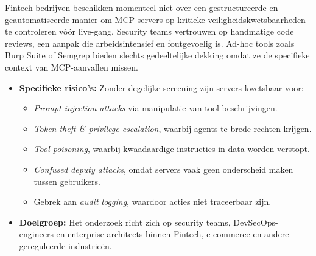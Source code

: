 Fintech-bedrijven beschikken momenteel niet over een gestructureerde en geautomatiseerde manier om MCP-servers op kritieke veiligheidskwetsbaarheden te controleren vóór live-gang. Security teams vertrouwen op handmatige code reviews, een aanpak die arbeidsintensief en foutgevoelig is. Ad-hoc tools zoals Burp Suite of Semgrep bieden slechts gedeeltelijke dekking omdat ze de specifieke context van MCP-aanvallen missen.

\begin{itemize}
  \item \textbf{Specifieke risico's:} Zonder degelijke screening zijn servers kwetsbaar voor:
        \begin{itemize}
          \item \emph{Prompt injection attacks} via manipulatie van tool-beschrijvingen.
          \item \emph{Token theft \& privilege escalation}, waarbij agents te brede rechten krijgen.
          \item \emph{Tool poisoning}, waarbij kwaadaardige instructies in data worden verstopt.
          \item \emph{Confused deputy attacks}, omdat servers vaak geen onderscheid maken tussen gebruikers.
          \item Gebrek aan \emph{audit logging}, waardoor acties niet traceerbaar zijn.
        \end{itemize}
  \item \textbf{Doelgroep:} Het onderzoek richt zich op security teams, DevSecOps-engineers en enterprise architects binnen Fintech, e-commerce en andere gereguleerde industrieën.
\end{itemize}


\section{}%
\label{sec:onderzoeksvraag}

